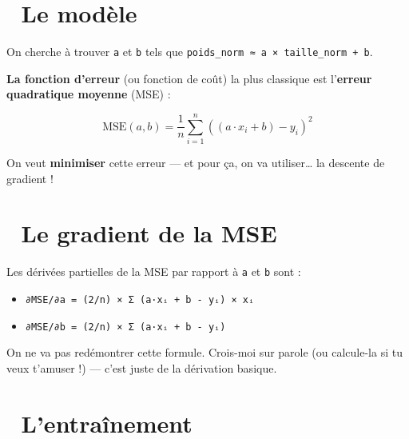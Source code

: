 \documentclass[
  french,
  11pt,
  a4paper,
]{scrbook}
\providecommand{\tightlist}{%
  \setlength{\itemsep}{0pt}\setlength{\parskip}{0pt}}
\begin{document}
\section{🎯 Le modèle}\label{le-moduxe8le}

On cherche à trouver \texttt{a} et \texttt{b} tels que
\texttt{poids\_norm\ ≈\ a\ ×\ taille\_norm\ +\ b}.

\textbf{La fonction d'erreur} (ou fonction de coût) la plus classique
est l'\textbf{erreur quadratique moyenne} (MSE) :

\[\text{MSE}(a, b) = \frac{1}{n} \sum_{i=1}^{n} \left( (a \cdot x_i + b) - y_i \right)^2\]

On veut \textbf{minimiser} cette erreur --- et pour ça, on va
utiliser\ldots{} la descente de gradient !

\section{🧮 Le gradient de la MSE}\label{le-gradient-de-la-mse}

Les dérivées partielles de la MSE par rapport à \texttt{a} et \texttt{b}
sont :

\begin{itemize}
\tightlist
\item
  \texttt{∂MSE/∂a\ =\ (2/n)\ ×\ Σ\ (a·xᵢ\ +\ b\ -\ yᵢ)\ ×\ xᵢ}
\item
  \texttt{∂MSE/∂b\ =\ (2/n)\ ×\ Σ\ (a·xᵢ\ +\ b\ -\ yᵢ)}
\end{itemize}

On ne va pas redémontrer cette formule. Crois-moi sur parole (ou
calcule-la si tu veux t'amuser !) --- c'est juste de la dérivation
basique.

\section{🚀 L'entraînement}\label{lentrauxeenement}
\end{document}
